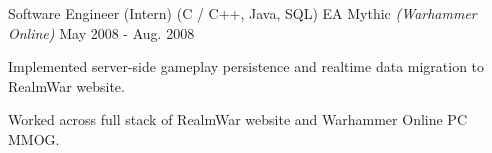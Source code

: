\begin{cventries}

  \cventry
    {{\color{awesome}Software Engineer (Intern)} (C / C++, Java, SQL)} %
    {EA Mythic \textit{(Warhammer Online)}} %
    {} %
    {May 2008 - Aug. 2008} %
    { %
      \begin{cvitems}
        \item {Implemented server-side gameplay persistence and realtime data migration to RealmWar website.}
        \item {Worked across full stack of RealmWar website and Warhammer Online PC MMOG.}
      \end{cvitems}
    }


\end{cventries}
